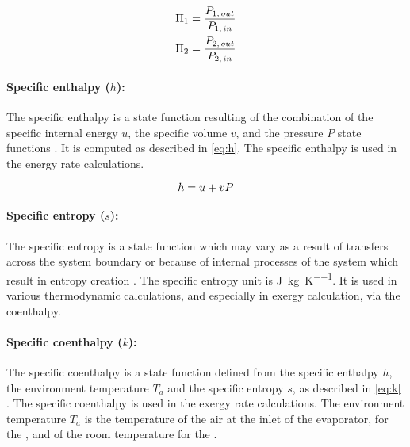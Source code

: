 \begin{subequations}
  \label{eq:PR}
  \begin{align}
  \Pi_1 = \dfrac{P_{1,\,out}}{P_{1,\,in}}
  \tagaddtexttwo{$\left[-\right]$} \\
  \Pi_2 = \dfrac{P_{2,\,out}}{P_{2,\,in}}
  \tagaddtexttwo{$\left[-\right]$}
  \end{align}
\end{subequations}



\paragraph{Specific enthalpy ($h$):}

The specific enthalpy is a state function resulting of the combination
of the specific internal energy $u$, the specific volume $v$, and the
pressure $P$ state functions \citep[p.\,19]{Borel-Favrat-2010a}. It is
computed as described in \cref{eq:h}. The specific enthalpy is used in
the energy rate calculations.

\begin{equation}
  \label{eq:h}
  h = u + vP
  \tagaddtextone{$\left[\si{\joule\per\kilo\gram}\right]$}
\end{equation}

\paragraph{Specific entropy ($s$):}
The specific entropy is a state function which may vary as a result of
transfers across the system boundary or because of internal processes
of the system which result in entropy creation
\citep[p.\,37]{Borel-Favrat-2010a}. The specific entropy unit is
\si{\joule\per\kilo\gram\per\kelvin}. It is used in various
thermodynamic calculations, and especially in exergy calculation, via
the coenthalpy.


\paragraph{Specific coenthalpy ($k$):}
The specific coenthalpy is a state function defined from the specific
enthalpy $h$, the environment temperature $T_a$ and the specific
entropy $s$, as described in \cref{eq:k}
\citep[p.\,410]{Borel-Favrat-2010a}. The specific coenthalpy is used
in the exergy rate calculations. The environment temperature $T_a$ is
the temperature of the air at the inlet of the evaporator, for the
\AWP{}, and of the room temperature for the \BWP{}.

